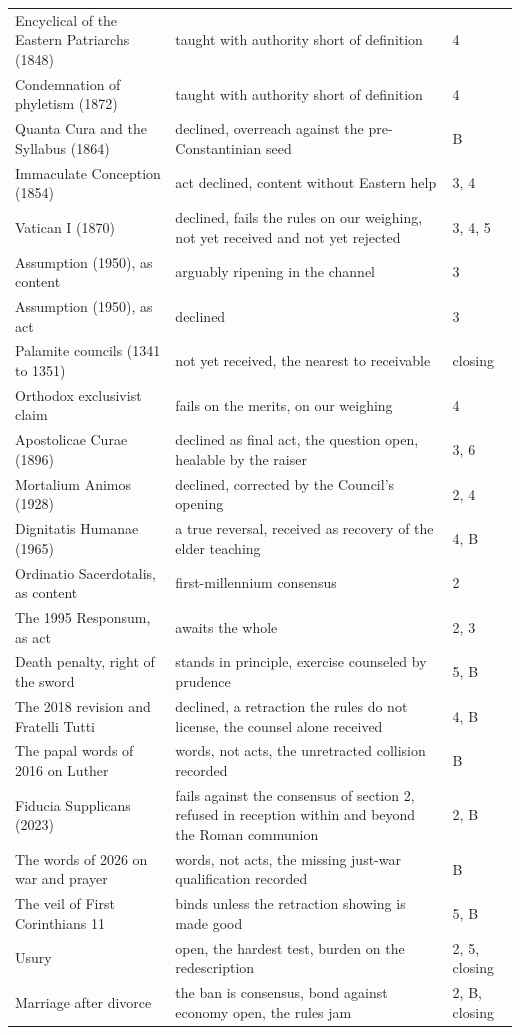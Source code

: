 \documentclass[11pt,twoside]{article}
\newlength{\actcol}
\newlength{\gradecol}
\begin{document}
\begin{longtable}{>{\raggedright\arraybackslash}p{\actcol}>{\raggedright\arraybackslash}p{\gradecol}l}
Encyclical of the Eastern Patriarchs (1848) & taught with authority short of definition & 4 \\
Condemnation of phyletism (1872) & taught with authority short of definition & 4 \\
Quanta Cura and the Syllabus (1864) & declined, overreach against the pre-Constantinian seed & B \\
Immaculate Conception (1854) & act declined, content without Eastern help & 3, 4 \\
Vatican I (1870) & declined, fails the rules on our weighing, not yet received and not yet rejected & 3, 4, 5 \\
Assumption (1950), as content & arguably ripening in the channel & 3 \\
Assumption (1950), as act & declined & 3 \\
Palamite councils (1341 to 1351) & not yet received, the nearest to receivable & closing \\
Orthodox exclusivist claim & fails on the merits, on our weighing & 4 \\
Apostolicae Curae (1896) & declined as final act, the question open, healable by the raiser & 3, 6 \\
Mortalium Animos (1928) & declined, corrected by the Council's opening & 2, 4 \\
Dignitatis Humanae (1965) & a true reversal, received as recovery of the elder teaching & 4, B \\
Ordinatio Sacerdotalis, as content & first-millennium consensus & 2 \\
The 1995 Responsum, as act & awaits the whole & 2, 3 \\
Death penalty, right of the sword & stands in principle, exercise counseled by prudence & 5, B \\
The 2018 revision and Fratelli Tutti & declined, a retraction the rules do not license, the counsel alone received & 4, B \\
The papal words of 2016 on Luther & words, not acts, the unretracted collision recorded & B \\
Fiducia Supplicans (2023) & fails against the consensus of section 2, refused in reception within and beyond the Roman communion & 2, B \\
The words of 2026 on war and prayer & words, not acts, the missing just-war qualification recorded & B \\
The veil of First Corinthians 11 & binds unless the retraction showing is made good & 5, B \\
Usury & open, the hardest test, burden on the redescription & 2, 5, closing \\
Marriage after divorce & the ban is consensus, bond against economy open, the rules jam & 2, B, closing \\
\end{longtable}
\end{document}
